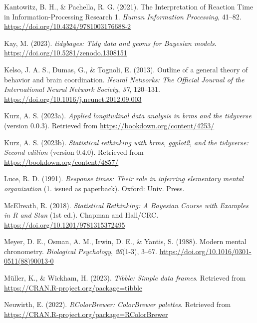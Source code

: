 \documentclass[
  man,floatsintext]{apa6}
\newlength{\cslhangindent}
\newenvironment{CSLReferences}[2] %
 {\begin{list}{}{%
  \setlength{\itemindent}{0pt}
  \setlength{\leftmargin}{0pt}
  \setlength{\parsep}{0pt}
  \ifodd #1
   \setlength{\leftmargin}{\cslhangindent}
   \setlength{\itemindent}{-1\cslhangindent}
  \fi
  \setlength{\itemsep}{#2\baselineskip}}}
 {\end{list}}
\begin{document}
\begin{CSLReferences}{1}{0}
Kantowitz, B. H., \& Pachella, R. G. (2021). The {Interpretation} of {Reaction Time} in {Information-Processing Research} 1. \emph{Human Information Processing}, 41--82. \url{https://doi.org/10.4324/9781003176688-2}

Kay, M. (2023). \emph{{tidybayes}: Tidy data and geoms for {Bayesian} models}. \url{https://doi.org/10.5281/zenodo.1308151}

Kelso, J. A. S., Dumas, G., \& Tognoli, E. (2013). Outline of a general theory of behavior and brain coordination. \emph{Neural Networks: The Official Journal of the International Neural Network Society}, \emph{37}, 120--131. \url{https://doi.org/10.1016/j.neunet.2012.09.003}

Kurz, A. S. (2023a). \emph{Applied longitudinal data analysis in brms and the tidyverse} (version 0.0.3). Retrieved from \url{https://bookdown.org/content/4253/}

Kurz, A. S. (2023b). \emph{Statistical rethinking with brms, ggplot2, and the tidyverse: {Second} edition} (version 0.4.0). Retrieved from \url{https://bookdown.org/content/4857/}

Luce, R. D. (1991). \emph{Response times: Their role in inferring elementary mental organization} (1. issued as paperback). Oxford: Univ. Press.

McElreath, R. (2018). \emph{Statistical {Rethinking}: {A Bayesian Course} with {Examples} in {R} and {Stan}} (1st ed.). {Chapman and Hall/CRC}. \url{https://doi.org/10.1201/9781315372495}

Meyer, D. E., Osman, A. M., Irwin, D. E., \& Yantis, S. (1988). Modern mental chronometry. \emph{Biological Psychology}, \emph{26}(1-3), 3--67. \url{https://doi.org/10.1016/0301-0511(88)90013-0}

Müller, K., \& Wickham, H. (2023). \emph{Tibble: Simple data frames}. Retrieved from \url{https://CRAN.R-project.org/package=tibble}

Neuwirth, E. (2022). \emph{RColorBrewer: ColorBrewer palettes}. Retrieved from \url{https://CRAN.R-project.org/package=RColorBrewer}


\end{CSLReferences}
\end{document}
